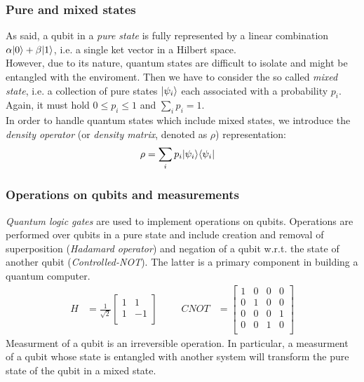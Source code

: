 \documentclass{beamer}
\DeclarePairedDelimiter\bra{\langle}{\rvert}
\DeclarePairedDelimiter\ket{\lvert}{\rangle}
\begin{document}
\begin{frame}
\frametitle{Pure and mixed states}
As said, a qubit in a \emph{pure state} is fully represented by a linear combination $\alpha \ket{0} + \beta \ket{1}$, i.e. a single ket vector in a Hilbert space. \\
However, due to its nature, quantum states are difficult to isolate and might be entangled with the enviroment. Then we have to consider the so called \emph{mixed state}, i.e. a collection of pure states $\ket{\psi_i}$ each associated with a probability $p_i$. \\
Again, it must hold $0 \leq p_i \leq 1$ and $\sum_i p_i = 1$. \\
In order to handle quantum states which include mixed states, we introduce the \emph{density operator} (or \emph{density matrix}, denoted as $\rho$) representation:
	\begin{align*}
		\rho &= \sum_i p_i \ket{\psi_i}\bra{\psi_i}
	\end{align*}
\end{frame}

\begin{frame}
\frametitle{Operations on qubits and measurements}
\emph{Quantum logic gates} are used to implement operations on qubits. Operations are performed over qubits in a pure state and include creation and removal of superposition (\emph{Hadamard operator}) and negation of a qubit w.r.t. the state of another qubit (\emph{Controlled-NOT}). The latter is a primary component in building a quantum computer.
	\begin{align*}
		H &= \frac{1}{\sqrt{2}}\begin{bmatrix}
           1 & 1\\
           1 & -1\\
         \end{bmatrix}
         & & &
        CNOT &= \begin{bmatrix}
           1 & 0 & 0 & 0\\
           0 & 1 & 0 & 0\\
           0 & 0 & 0 & 1\\
           0 & 0 & 1 & 0\\
         \end{bmatrix}
	\end{align*}
Measurment of a qubit is an irreversible operation. In particular, a measurment of a qubit whose state is entangled with another system will transform the pure state of the qubit in a mixed state. 
\end{frame}
\end{document}
